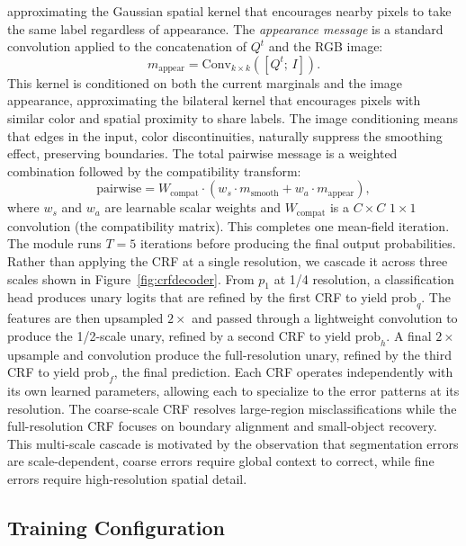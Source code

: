 \documentclass[conference]{IEEEtran}
\begin{document}
approximating the Gaussian spatial kernel that encourages nearby pixels to take the same label regardless
of appearance. The \emph{appearance message} is a standard convolution applied to the
concatenation of $Q^t$ and the RGB image:
\begin{equation}
  m_{\mathrm{appear}} = \mathrm{Conv}_{k\times k}([Q^t;\,I]).
  \label{eq:mappear}
\end{equation}
This kernel is conditioned on both the current marginals and the image appearance, approximating the
bilateral kernel that encourages pixels with similar color and spatial proximity to share labels. The image
conditioning means that edges in the input, color discontinuities, naturally suppress the smoothing effect,
preserving boundaries. The total pairwise message is a weighted combination followed by the
compatibility transform:
\begin{equation}
  \mathrm{pairwise} = W_{\mathrm{compat}}\cdot
                      (w_s\cdot m_{\mathrm{smooth}} + w_a\cdot m_{\mathrm{appear}}),
  \label{eq:pairwise}
\end{equation}
where $w_s$ and $w_a$ are learnable scalar weights and $W_{\mathrm{compat}}$
is a $C\!\times\!C$ $1\!\times\!1$ convolution (the compatibility matrix).
This completes one mean-field iteration. The module runs $T = 5$ iterations before producing the final
output probabilities. Rather than applying the CRF at a single resolution, we cascade it across three scales
shown in Figure~\ref{fig:crfdecoder}. From $p_1$ at 1/4 resolution, a classification head produces unary logits that are refined
by the first CRF to yield $\mathrm{prob}_q$. The features are then upsampled $2\times$ and passed through a lightweight
convolution to produce the 1/2-scale unary, refined by a second CRF to yield $\mathrm{prob}_h$. A final $2\times$ upsample
and convolution produce the full-resolution unary, refined by the third CRF to yield $\mathrm{prob}_f$, the final
prediction. Each CRF operates independently with its own learned parameters, allowing each to specialize
to the error patterns at its resolution. The coarse-scale CRF resolves large-region misclassifications while
the full-resolution CRF focuses on boundary alignment and small-object recovery. This multi-scale
cascade is motivated by the observation that segmentation errors are scale-dependent, coarse errors require
global context to correct, while fine errors require high-resolution spatial detail.

\subsection{Training Configuration}\label{subsec:training}
\end{document}
